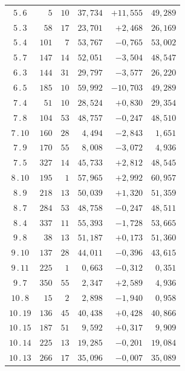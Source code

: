 \begin{center}
\begin{tabular}[t]{|c|r@{\;}r@{\;}r|r|r|}
$5\, .\, 6$ & $5$ & $10$ & $37{,}734$ & $+11{,}555$ & $49{,}289$\\
$5\, .\, 3$ & $58$ & $17$ & $23{,}701$ & $+2{,}468$ & $26{,}169$\\
$5\, .\, 4$ & $101$ & $7$ & $53{,}767$ & $-0{,}765$ & $53{,}002$\\
$5\, .\, 7$ & $147$ & $14$ & $52{,}051$ & $-3{,}504$ & $48{,}547$\\[7pt]
$6\, .\, 3$ & $144$ & $31$ & $29{,}797$ & $-3{,}577$ & $26{,}220$\\
$6\, .\, 5$ & $185$ & $10$ & $59{,}992$ & $-10{,}703$ & $49{,}289$\\[7pt]
$7\, .\, 4$ & $51$ & $10$ & $28{,}524$ & $+0{,}830$ & $29{,}354$\\
$7\, .\, 8$ & $104$ & $53$ & $48{,}757$ & $-0{,}247$ & $48{,}510$\\
$7\, .\, 10$ & $160$ & $28$ & $4{,}494$ & $-2{,}843$ & $1{,}651$\\
$7\, .\, 9$ & $170$ & $55$ & $8{,}008$ & $-3{,}072$ & $4{,}936$\\
$7\, .\, 5$ & $327$ & $14$ & $45{,}733$ & $+2{,}812$ & $48{,}545$\\[7pt]
$8\, .\, 10$ & $195$ & $1$ & $57{,}965$ & $+2{,}992$ & $60{,}957$\\
$8\, .\, 9$ & $218$ & $13$ & $50{,}039$ & $+1{,}320$ & $51{,}359$\\
$8\, .\, 7$ & $284$ & $53$ & $48{,}758$ & $-0{,}247$ & $48{,}511$\\
$8\, .\, 4$ & $337$ & $11$ & $55{,}393$ & $-1{,}728$ & $53{,}665$\\[7pt]
$9\, .\, 8$ & $38$ & $13$ & $51{,}187$ & $+0{,}173$ & $51{,}360$\\
$9\, .\, 10$ & $137$ & $28$ & $44{,}011$ & $-0{,}396$ & $43{,}615$\\
$9\, .\, 11$ & $225$ & $1$ & $0{,}663$ & $-0{,}312$ & $0{,}351$\\
$9\, .\, 7$ & $350$ & $55$ & $2{,}347$ & $+2{,}589$ & $4{,}936$\\[7pt]
$10\, .\, 8$ & $15$ & $2$ & $2{,}898$ & $-1{,}940$ & $0{,}958$\\
$10\, .\, 19$ & $136$ & $45$ & $40{,}438$ & $+0{,}428$ & $40{,}866$\\
$10\, .\, 15$ & $187$ & $51$ & $9{,}592$ & $+0{,}317$ & $9{,}909$\\
$10\, .\, 14$ & $225$ & $13$ & $19{,}285$ & $-0{,}201$ & $19{,}084$\\
$10\, .\, 13$ & $266$ & $17$ & $35{,}096$ & $-0{,}007$ & $35{,}089$\\

\end{tabular}
\end{center}
